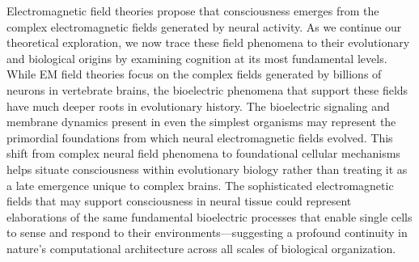 Electromagnetic field theories propose that consciousness emerges from the complex electromagnetic fields generated by neural activity. As we continue our theoretical exploration, we now trace these field phenomena to their evolutionary and biological origins by examining cognition at its most fundamental levels. While EM field theories focus on the complex fields generated by billions of neurons in vertebrate brains, the bioelectric phenomena that support these fields have much deeper roots in evolutionary history. The bioelectric signaling and membrane dynamics present in even the simplest organisms may represent the primordial foundations from which neural electromagnetic fields evolved. This shift from complex neural field phenomena to foundational cellular mechanisms helps situate consciousness within evolutionary biology rather than treating it as a late emergence unique to complex brains. The sophisticated electromagnetic fields that may support consciousness in neural tissue could represent elaborations of the same fundamental bioelectric processes that enable single cells to sense and respond to their environments—suggesting a profound continuity in nature's computational architecture across all scales of biological organization.
